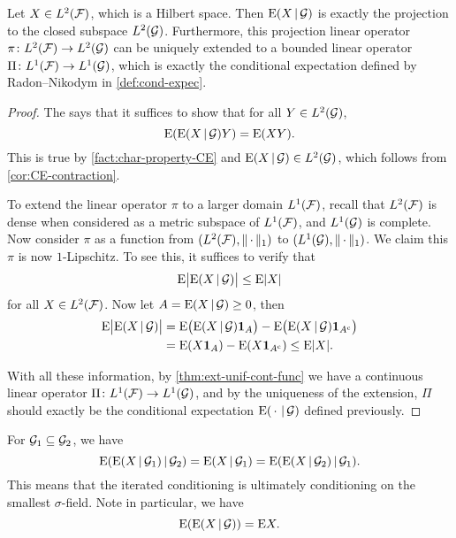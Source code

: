\begin{thm}
    Let $X \in L^2(\mathcal{F})$, which is a Hilbert space. Then $\mathop{}\!\mathrm{E}(X \,|\, \mathcal{G})$ is exactly the projection to the closed subspace $L^2(\mathcal{G})$. Furthermore, this projection linear operator $\pi\colon L^2(\mathcal{F}) \to L^2(\mathcal{G})$ can be uniquely extended to a bounded linear operator $\Pi\colon L^1(\mathcal{F})\to L^1(\mathcal{G})$, which is exactly the conditional expectation defined by Radon--Nikodym in \cref{def:cond-expec}.
\end{thm}
\begin{proof}
    The  says that it suffices to show that for all $Y \in L^2(\mathcal{G})$, \[
        \mathop{}\!\mathrm{E}(\mathop{}\!\mathrm{E}(X \,|\, \mathcal{G}) Y) = \mathop{}\!\mathrm{E}(XY).
    \]
    This is true by \cref{fact:char-property-CE} and $\mathop{}\!\mathrm{E}(X \,|\, \mathcal{G}) \in L^2(\mathcal{G})$, which follows from \cref{cor:CE-contraction}.
    
    To extend the linear operator $\pi$ to a larger domain $L^1(\mathcal{F})$, recall that $L^2(\mathcal{F})$ is dense when considered as a metric subspace of $L^1(\mathcal{F})$, and $L^1(\mathcal{G})$ is complete. Now consider $\pi$ as a function from $(L^2(\mathcal{F}),\lVert \,\cdot\, \rVert_1)$ to $(L^1(\mathcal{G}),\lVert \,\cdot\, \rVert_1)$. We claim this $\pi$ is now $1$-Lipschitz. To see this, it suffices to verify that \[
        \mathop{}\!\mathrm{E} \bigl\vert\mathop{}\!\mathrm{E}(X\,|\, \mathcal{G})\bigr\vert \leq \mathop{}\!\mathrm{E} \lvert X \rvert
    \] for all $X \in L^2(\mathcal{F})$. Now let $A = {\mathop{}\!\mathrm{E}(X \,|\, \mathcal{G}) \geq 0}$, then \begin{align*}
        \E \bigl\vert\E(X\giv \G)\bigr\vert & = \E\bigl(\E (X \giv \G)\ind_A\bigr) - \E\bigl(\E(X \giv \G)\ind_{A^\cpl}\bigr) \\
        & = \E(X \ind_A) - \E(X\ind_{A^\cpl}) \leq \E\abs{X}.
    \end{align*}

    With all these information, by \cref{thm:ext-unif-cont-func} we have a continuous linear operator $\Pi\colon L^1(\mathcal{F}) \to L^1(\mathcal{G})$, and by the uniqueness of the extension, $\Pi$ should exactly be the conditional expectation $\mathop{}\!\mathrm{E}(\,\cdot\, \,|\, \mathcal{G})$ defined previously.
\end{proof}

\begin{namedthm} \label{thm:tower}
    For $\mathcal{G}_1 \subseteq \mathcal{G}_2$, we have \[
        \mathop{}\!\mathrm{E}(\mathop{}\!\mathrm{E}(X\,|\, \mathcal{G}_1) \,|\, \mathcal{G}_2) = \mathop{}\!\mathrm{E}(X\,|\, \mathcal{G}_1) = \mathop{}\!\mathrm{E}(\mathop{}\!\mathrm{E}(X\,|\, \mathcal{G}_2) \,|\, \mathcal{G}_1).
    \] This means that the iterated conditioning is ultimately conditioning on the smallest $\sigma$-field. Note in particular, we have \[
        \mathop{}\!\mathrm{E}(\mathop{}\!\mathrm{E}(X \,|\, \mathcal{G})) = \mathop{}\!\mathrm{E} X.
    \]
\end{namedthm}

